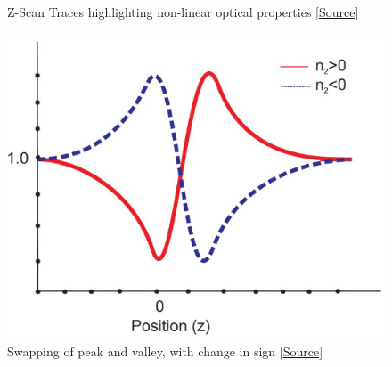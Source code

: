 \documentclass[%
 reprint,
amsmath,
amssymb,
10pt
]{revtex4-2}
\begin{document}
\begin{figure}
\\%
%
\captionsetup{width=0.4\textwidth}
\caption{Z-Scan Traces highlighting non-linear optical properties [\href{http://cleanenergywiki.org/index.php?title=Femtosecond_Z-Scan_Spectrometer}{Source}]}
\label{fig:th2}
\end{figure}

\begin{figure}
    \centering
    \includegraphics[width=\linewidth]{images/swap.png}
    \caption{Swapping of peak and valley, with change in sign [\href{https://www.holmarc.com/z_scan_system.php}{Source}]}
    \label{fig:swap}
\end{figure}
\end{document}

